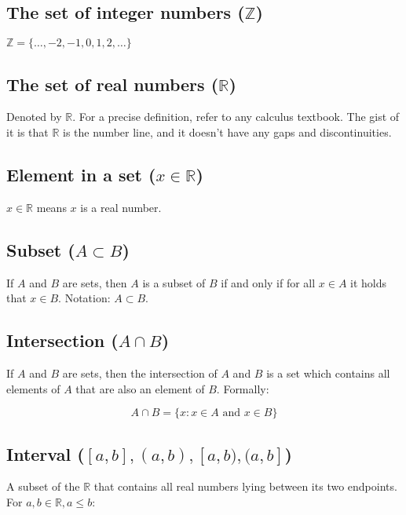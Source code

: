 \documentclass{article}
\begin{document}
      \subsection{The set of integer numbers ($\mathbb{Z}$)}
        $\mathbb{Z} = \{ \ldots, -2, -1, 0, 1, 2, \ldots \}$

      \subsection{The set of real numbers ($\mathbb{R}$)}

        Denoted by $\mathbb{R}$. For a precise definition, refer to any
        calculus textbook. The gist of it is that $\mathbb{R}$ is the number
        line, and it doesn't have any gaps and discontinuities.

      \subsection{Element in a set ($x \in \mathbb{R}$)}

        $x \in \mathbb{R}$ means $x$ is a real number.

      \subsection{Subset ($A \subset B$)}

        If $A$ and $B$ are sets, then $A$ is a subset of $B$ if and only if
        for all $x \in A$ it holds that $x \in B$. Notation: $A \subset B$.

      \subsection{Intersection ($A \cap B$)}

        If $A$ and $B$ are sets, then the intersection of $A$ and $B$ is a set
        which contains all elements of $A$ that are also an element of $B$.
        Formally:

        $$A \cap B = \{ x : x \in A \text{ and } x \in B \}$$

      \subsection{Interval ($[a, b], (a, b), [a, b), (a, b]$)}

        A subset of the $\mathbb{R}$ that contains all real numbers lying
        between its two endpoints. For $a, b \in \mathbb{R}, a \leq b$:
\end{document}
